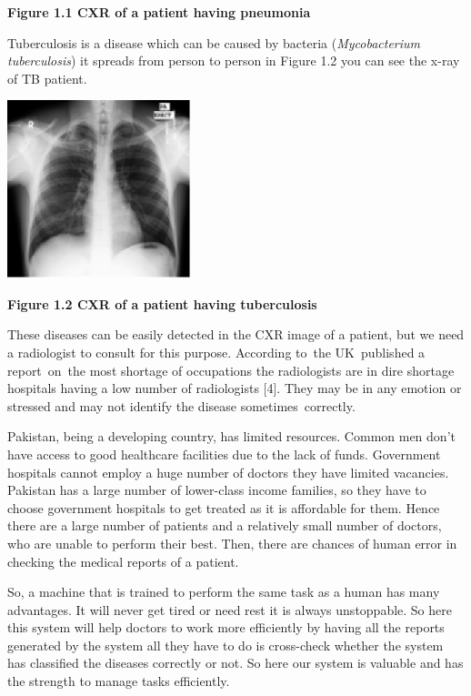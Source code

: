 \documentclass{article} %
\begin{document}
\noindent \textbf{Figure 1.1 CXR of a patient having pneumonia}

\noindent Tuberculosis is a disease which can be caused by bacteria (\textit{Mycobacterium tuberculosis}) it spreads from person to person in Figure 1.2 you can see the x-ray of TB patient. 

\noindent \includegraphics*[width=2.11in, height=2.04in, keepaspectratio=false]{image14}

\noindent \textbf{Figure 1.2 CXR of a patient having tuberculosis}

\noindent 

\noindent These diseases can be easily detected in the CXR image of a patient, but we need a radiologist to consult for this purpose. According to~the UK~published a report~on~the most shortage of occupations the radiologists are in dire shortage hospitals having a low number of radiologists [4]. They may be in any emotion or stressed and may not identify the disease sometimes~correctly.~

\noindent Pakistan, being a developing country, has limited resources. Common men don't have access to good healthcare facilities due to the lack of funds. Government hospitals cannot employ a huge number of doctors they have limited vacancies. Pakistan has a large number of lower-class income families, so they have to choose government hospitals to get treated as it is affordable for them. Hence there are a large number of patients and a relatively small number of doctors, who are unable to perform their best. Then, there are chances of human error in checking the medical reports of a patient. 

\noindent So, a machine that is trained to perform the same task as a human has many advantages. It will never get tired or need rest it is always unstoppable. So here this system will help doctors to work more efficiently by having all the reports generated by the system all they have to do is cross-check whether the system has classified the diseases correctly or not. So here our system is valuable and has the strength to manage tasks efficiently.
\end{document}
